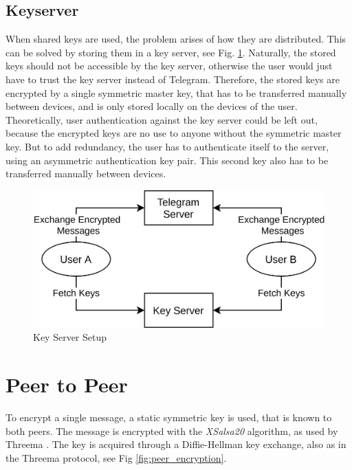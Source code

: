 \documentclass[a4paper, oneside]{discothesis}
\begin{document}
\subsection{Keyserver}

When shared keys are used, the problem arises of how they are distributed. This can be solved by storing them in a key server, see Fig. \ref{fig:structure}. Naturally, the stored keys should not be accessible by the key server, otherwise the user would just have to trust the key server instead of Telegram. Therefore, the stored keys are encrypted by a single symmetric master key, that has to be transferred manually between devices, and is only stored locally on the devices of the user. Theoretically, user authentication against the key server could be left out, because the encrypted keys are no use to anyone without the symmetric master key. But to add redundancy, the user has to authenticate itself to the server, using an asymmetric authentication key pair. This second key also has to be transferred manually between devices.


\begin{figure}[h!]
    \centering
    \includegraphics[width=\columnwidth]{figures/structure.png}
    \caption{Key Server Setup}
    \label{fig:structure}
\end{figure}




\section{Peer to Peer}
To encrypt a single message, a static symmetric key is used, that is known to both peers. The message is encrypted with the \emph{XSalsa20} algorithm, as used by Threema \cite{Threema}. The key is acquired through a Diffie-Hellman key exchange, also as in the Threema protocol, see Fig \ref{fig:peer_encryption}.
\end{document}
